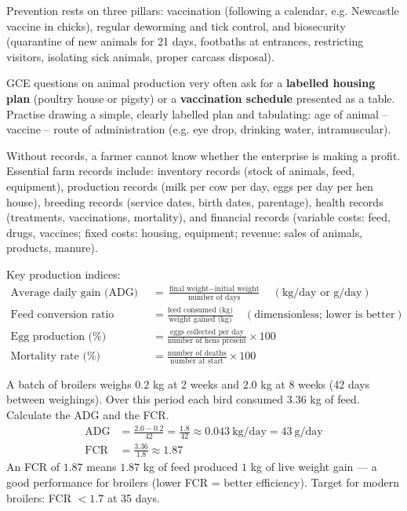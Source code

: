 \documentclass[11pt]{article}
\newcommand{\cle}[1]{{\popxbold\color{popdark}#1}}
\newcounter{popsec}
\newcounter{popsub}
\newcommand{\courssub}[1]{%
  \stepcounter{popsub}%
  \par\vspace{9pt}\noindent{\popxbold\fontsize{11.5}{13}\selectfont\color{popink}{\color{poporange}\thepopsec.\thepopsub}\hspace{6pt}#1}\par\nopagebreak\vspace{4pt}
}
\begin{document}
Prevention rests on three pillars: \cle{vaccination} (following a calendar, e.g. Newcastle vaccine in chicks), regular \cle{deworming} and tick control, and \cle{biosecurity} (quarantine of new animals for 21 days, footbaths at entrances, restricting visitors, isolating sick animals, proper carcass disposal).

\begin{attention}
GCE questions on animal production very often ask for a \textbf{labelled housing plan} (poultry house or pigsty) or a \textbf{vaccination schedule} presented as a table. Practise drawing a simple, clearly labelled plan and tabulating: age of animal -- vaccine -- route of administration (e.g. eye drop, drinking water, intramuscular).
\end{attention}

\courssub{Records, Economics and Improvement}

Without records, a farmer cannot know whether the enterprise is making a profit. Essential \cle{farm records} include: inventory records (stock of animals, feed, equipment), production records (milk per cow per day, eggs per day per hen house), breeding records (service dates, birth dates, parentage), health records (treatments, vaccinations, mortality), and financial records (variable costs: feed, drugs, vaccines; fixed costs: housing, equipment; revenue: sales of animals, products, manure).

Key \cle{production indices}:
\begin{align*}
\text{Average daily gain (ADG)} &= \frac{\text{final weight} - \text{initial weight}}{\text{number of days}} \quad (\text{kg/day or g/day}) \\
\text{Feed conversion ratio (FCR)} &= \frac{\text{feed consumed (kg)}}{\text{weight gained (kg)}} \quad (\text{dimensionless; lower is better}) \\
\text{Egg production (\%)} &= \frac{\text{eggs collected per day}}{\text{number of hens present}}\times 100 \\
\text{Mortality rate (\%)} &= \frac{\text{number of deaths}}{\text{number at start}}\times 100
\end{align*}

\begin{exoresolu}
A batch of broilers weighs $0.2$ kg at 2 weeks and $2.0$ kg at 8 weeks (42 days between weighings). Over this period each bird consumed $3.36$ kg of feed. Calculate the ADG and the FCR.
\tcblower
\begin{align*}
\text{ADG} &= \frac{2.0 - 0.2}{42} = \frac{1.8}{42} \approx 0.043\ \text{kg/day} = 43\ \text{g/day} \\
\text{FCR} &= \frac{3.36}{1.8} \approx 1.87
\end{align*}
An FCR of $1.87$ means $1.87$ kg of feed produced $1$ kg of live weight gain — a good performance for broilers (lower FCR = better efficiency). Target for modern broilers: FCR $< 1.7$ at 35 days.
\end{exoresolu}
\end{document}
